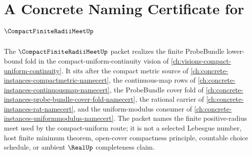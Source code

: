 \chapter{A Concrete Naming Certificate for $\CompactFiniteRadiiMeetUp$}
\label{ch:concrete-instances-compact-finite-radii-meet-namecert}

The $\CompactFiniteRadiiMeetUp$ packet realizes the finite ProbeBundle lower-bound fold in the compact-uniform-continuity vision of \autoref{ch:visions-compact-uniform-continuity}. It sits after the compact metric source of \autoref{ch:concrete-instances-compactmetric-namecert}, the continuous-map rows of \autoref{ch:concrete-instances-continuousmap-namecert}, the ProbeBundle cover fold of \autoref{ch:concrete-instances-probe-bundle-cover-fold-namecert}, the rational carrier of \autoref{ch:concrete-instances-rat-namecert}, and the uniform-modulus consumer of \autoref{ch:concrete-instances-uniformmodulus-namecert}. The packet names the finite positive-radius meet used by the compact-uniform route; it is not a selected Lebesgue number, host finite minimum theorem, open-cover compactness principle, countable choice schedule, or ambient $\RealUp$ completeness claim.


